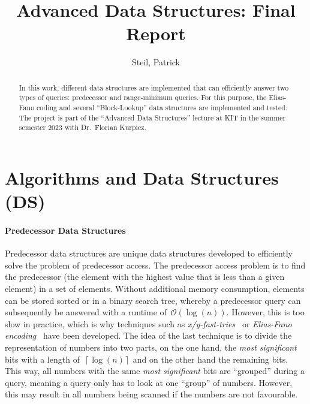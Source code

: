 \documentclass[a4paper,UKenglish,cleveref, autoref, thm-restate]{lipics-v2021}
\title{Advanced Data Structures: Final Report}
\author{Steil, Patrick}{2513240}{patrick.steil@student.kit.edu}{}{}
\begin{document}
	
	\maketitle
	
	\begin{abstract}
	In this work, different data structures are implemented that can efficiently answer two types of queries: predecessor and range-minimum queries. For this purpose, the Elias-Fano coding and several “Block-Lookup” data structures are implemented and tested. The project is part of the “Advanced Data Structures” lecture at KIT in the summer semester 2023 with Dr.~Florian Kurpicz.
	\end{abstract}
	\section{Algorithms and Data Structures (DS)}
	\label{sec:algorithms}
	\paragraph*{Predecessor Data Structures}
	Predecessor data structures are unique data structures developed to efficiently solve the problem of predecessor access. The predecessor access problem is to find the predecessor (the element with the highest value that is less than a given element) in a set of elements.
	Without additional memory consumption, elements can be stored sorted or in a binary search tree, whereby a predecessor query can subsequently be answered with a runtime of~$\mathcal{O}\left(\log(n)\right)$. However, this is too slow in practice, which is why techniques such as \textit{x/y-fast-tries}~\cite{WILLARD198381} or \textit{Elias-Fano encoding}~\cite{10.1145/321812.321820} have been developed. The idea of the last technique is to divide the representation of numbers into two parts, on the one hand, the \textit{most significant} bits with a length of~$\left\lceil\log\left(n\right)\right\rceil$ and on the other hand the remaining bits. This way, all numbers with the same \textit{most significant} bits are ``grouped'' during a query, meaning a query only has to look at one ``group'' of numbers. However, this may result in all numbers being scanned if the numbers are not favourable.	
\end{document}
